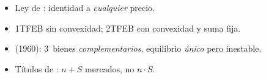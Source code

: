 \documentclass{article}
\begin{document}
\begin{columnas}
\begin{trampa}
\begin{itemize}
\item Ley de : identidad a \emph{cualquier} precio.
\item 1TFEB sin convexidad; 2TFEB con convexidad y suma fija.
\item {} (1960): 3~bienes \emph{complementarios}, equilibrio \emph{único} pero inestable.
\item Títulos de : $n+S$ mercados, no $n\cdot S$.
\end{itemize}
\end{trampa}

\end{columnas}
\end{document}
